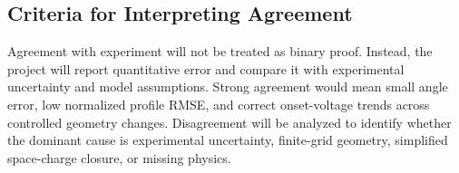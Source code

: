 \subsection{Criteria for Interpreting Agreement}

Agreement with experiment will not be treated as binary proof. Instead, the project will report quantitative error and compare it with experimental uncertainty and model assumptions. Strong agreement would mean small angle error, low normalized profile RMSE, and correct onset-voltage trends across controlled geometry changes. Disagreement will be analyzed to identify whether the dominant cause is experimental uncertainty, finite-grid geometry, simplified space-charge closure, or missing physics.
